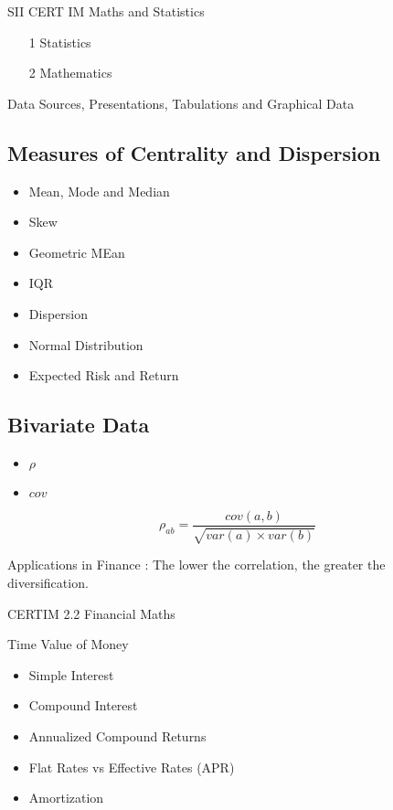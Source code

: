 
SII CERT IM Maths and Statistics

\begin{itemize}
\item[1] Statistics
\item[2] Mathematics
\end{itemize}

Data Sources, Presentations, Tabulations and Graphical Data

\subsection*{Measures of Centrality and Dispersion}
\begin{itemize}
\item Mean, Mode and Median
\item Skew
\item Geometric MEan
\item IQR
\item Dispersion
\item Normal Distribution
\item Expected Risk and Return
\end{itemize}



\subsection*{Bivariate Data}

\begin{itemize}
\item $\rho$
\item $cov$
\end{itemize}

\[  \rho_{ab} = \frac{cov(a,b)}{\sqrt{var(a) \times var(b)}}  \]

Applications in Finance : The lower the correlation, the greater the diversification.

CERTIM 2.2 Financial Maths

Time Value of Money

\begin{itemize}
\item Simple Interest
\item Compound Interest
\item Annualized Compound Returns
\item Flat Rates vs Effective Rates (APR)
\item Amortization
\end{itemize}

